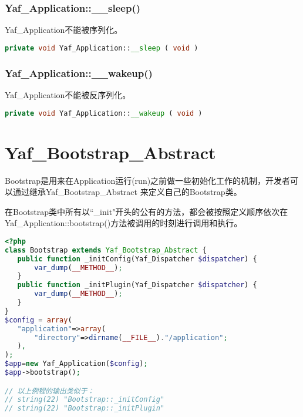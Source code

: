 \begin{lstlisting}[language=PHP]

\end{lstlisting}



\begin{lstlisting}[language=PHP]

\end{lstlisting}


\subsection{Yaf\_Application::\_\_sleep()}

Yaf\_Application不能被序列化。






\begin{lstlisting}[language=PHP]
private void Yaf_Application::__sleep ( void )
\end{lstlisting}



\subsection{Yaf\_Application::\_\_wakeup()}

Yaf\_Application不能被反序列化。







\begin{lstlisting}[language=PHP]
private void Yaf_Application::__wakeup ( void )
\end{lstlisting}

\chapter{Yaf\_Bootstrap\_Abstract}

Bootstrap是用来在Application运行(run)之前做一些初始化工作的机制，开发者可以通过继承Yaf\_Bootstrap\_Abstract 来定义自己的Bootstrap类。

在Bootstrap类中所有以``\_init"开头的公有的方法，都会被按照定义顺序依次在Yaf\_Application::bootstrap()方法被调用的时刻进行调用和执行。



\begin{lstlisting}[language=PHP]
<?php
class Bootstrap extends Yaf_Bootstrap_Abstract {
   public function _initConfig(Yaf_Dispatcher $dispatcher) {
       var_dump(__METHOD__);
   }
   public function _initPlugin(Yaf_Dispatcher $dispatcher) {
       var_dump(__METHOD__);
   }
}
$config = array(
   "application"=>array(
       "directory"=>dirname(__FILE__)."/application";
   ),
);
$app=new Yaf_Application($config);
$app->bootstrap();

// 以上例程的输出类似于：
// string(22) "Bootstrap::_initConfig"
// string(22) "Bootstrap::_initPlugin"
\end{lstlisting}





